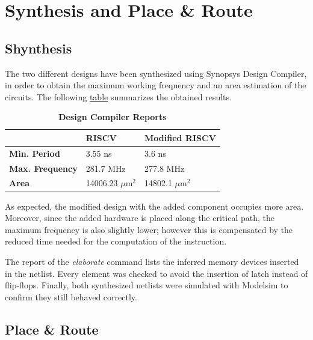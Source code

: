 %
\chapter{Synthesis and Place \& Route}
\label{cha6}

\section{Shynthesis}

The two different designs have been synthesized using Synopsys Design Compiler, in order to obtain the maximum working frequency and an area estimation of the circuits.
The following \hyperref[tab:performance]{table} summarizes the obtained results.  
\\
\begin{table}[h!]
    \centering
    \begin{tabular}{m{3cm} m{3cm} m{3cm}}
    \hline
         & \textbf{RISCV} & \textbf{Modified RISCV}\\
         \hline
         \textbf{Min. Period} & 3.55 ns & 3.6 ns\\
         \textbf{Max. Frequency} & 281.7 MHz& 277.8 MHz \\
         \textbf{Area} & 14006.23 $\mu$m$^{2}$ & 14802.1 $\mu$m$^{2}$ \\
         \hline
    \end{tabular}
    \caption{\textbf{Design Compiler Reports}}
    \label{tab:performance}
\end{table}

As expected, the modified design with the added component occupies more area. Moreover, since the added hardware is placed along the critical path, 
the maximum frequency is also slightly lower; however this is compensated by the reduced time needed for the computation of the instruction.

The report of the \emph{elaborate} command lists the inferred memory devices inserted in the netlist. Every element was checked to avoid the insertion of latch instead of 
flip-flops.
Finally, both synthesized netlists were simulated with Modelsim to confirm they still behaved correctly.

\section{Place \& Route}


